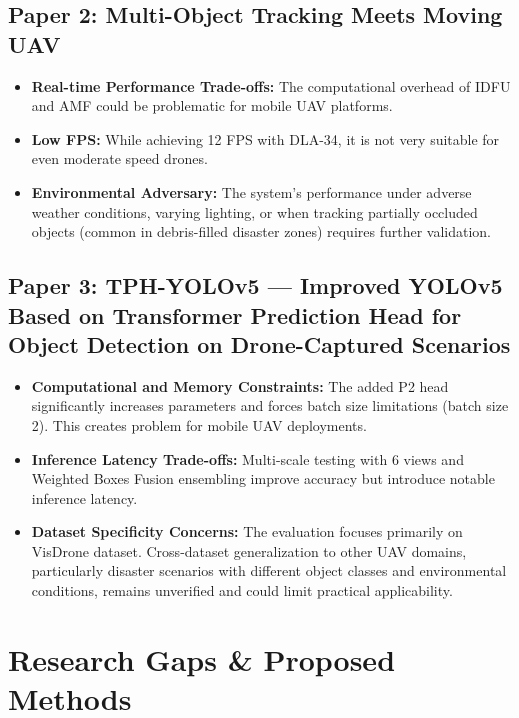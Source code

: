 \documentclass[12pt,a4paper]{report}
\begin{document}
\section{Paper 2: Multi-Object Tracking Meets Moving UAV}

\begin{itemize}
\item \textbf{Real-time Performance Trade-offs:} The computational overhead of IDFU and AMF  could be problematic for mobile UAV platforms.
\item \textbf{Low FPS:} While achieving 12 FPS with DLA-34, it is not very suitable for even moderate speed drones.

\item \textbf{Environmental Adversary:} The system's performance under adverse weather conditions, varying lighting, or when tracking partially occluded objects (common in debris-filled disaster zones) requires further validation.

\end{itemize}

\section{Paper 3: TPH-YOLOv5 — Improved YOLOv5 Based on Transformer Prediction Head for Object Detection on Drone-Captured Scenarios}

\begin{itemize}
\item \textbf{Computational and Memory Constraints:} The added P2 head significantly increases parameters and forces batch size limitations (batch size 2). This creates problem for mobile UAV deployments.

\item \textbf{Inference Latency Trade-offs:} Multi-scale testing with 6 views and Weighted Boxes Fusion ensembling improve accuracy but introduce notable inference latency.

\item \textbf{Dataset Specificity Concerns:} The evaluation focuses primarily on VisDrone dataset. Cross-dataset generalization to other UAV domains, particularly disaster scenarios with different object classes and environmental conditions, remains unverified and could limit practical applicability.

\end{itemize}

\chapter{Research Gaps \& Proposed Methods}
\end{document}
